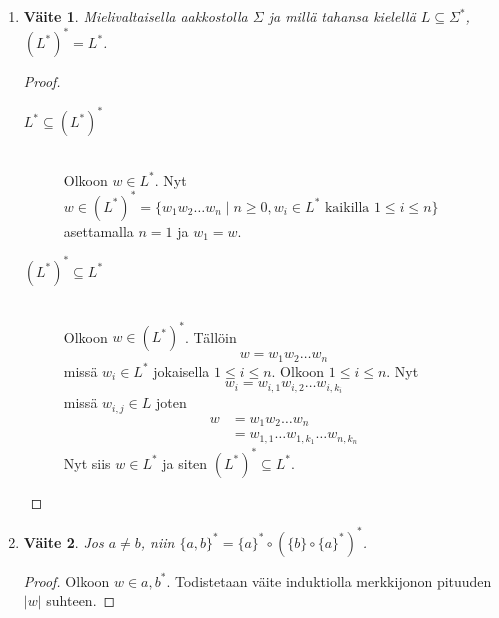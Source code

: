 \documentclass[a4paper,11pt]{article}
\newtheorem*{vaite}{Väite}
\begin{document}
\begin{enumerate}
\begin{enumerate}
  \item
    \begin{vaite}
      Mielivaltaisella aakkostolla $\Sigma$ ja millä tahansa kielellä
      $L \subseteq \Sigma^*$, $(L^*)^* = L^*$.
    \end{vaite}
    \begin{proof}
      \begin{description}
        \item[]
        \item[$L^* \subseteq (L^*)^*$] \hfill \\
          Olkoon $w \in L^*$. Nyt $w \in (L^*)^* = \{w_1w_2 \ldots w_n \mid n
          \ge 0, w_i \in L^* \text{ kaikilla } 1 \le i \le n\}$ asettamalla
          $n = 1$ ja $w_1 = w$.
        \item[$(L^*)^* \subseteq L^*$] \hfill \\
          Olkoon $w \in (L^*)^*$. Tällöin
          \begin{equation*}
            w = w_1w_2 \ldots w_n
          \end{equation*}
          missä $w_i \in L^*$ jokaisella $1 \le i \le n$. Olkoon $1 \le i
          \le n$. Nyt
          \begin{equation*}
            w_i = w_{i,1}w_{i,2} \ldots w_{i,k_i}
          \end{equation*}
          missä $w_{i,j} \in L$ joten
          \begin{align*}
            w &= w_1w_2 \ldots w_n \\
            &= w_{1,1} \ldots w_{1,k_1} \ldots w_{n,k_n}
          \end{align*}
          Nyt siis $w \in L^*$ ja siten $(L^*)^* \subseteq L^*$.
      \end{description}
      \end{proof}

  \item
    \begin{vaite}
      Jos $a \neq b$, niin $\{a,b\}^* = \{a\}^* \circ (\{b\} \circ \{a\}^*)^*$.
    \end{vaite}
    \begin{proof}
      Olkoon $w \in {a,b}^*$. Todistetaan väite induktiolla
      merkkijonon pituuden $|w|$ suhteen.
      
    \end{proof}


\end{enumerate}
\end{enumerate}
\end{document}
